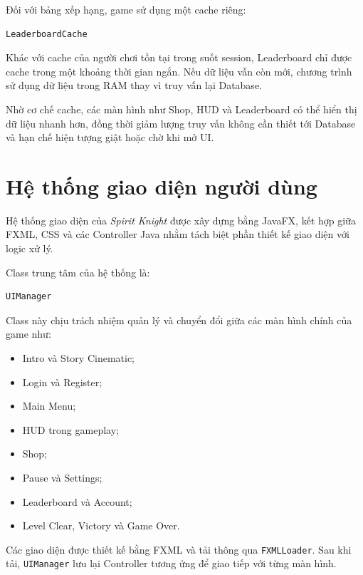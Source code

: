 \documentclass[12pt,a4paper]{report}
\begin{document}
    Đối với bảng xếp hạng, game sử dụng một cache riêng:

    \begin{verbatim}
LeaderboardCache
    \end{verbatim}

    Khác với cache của người chơi tồn tại trong suốt session,
    Leaderboard chỉ được cache trong một khoảng thời gian ngắn.
    Nếu dữ liệu vẫn còn mới, chương trình sử dụng dữ liệu trong RAM
    thay vì truy vấn lại Database.

    Nhờ cơ chế cache, các màn hình như Shop, HUD và Leaderboard có thể
    hiển thị dữ liệu nhanh hơn, đồng thời giảm lượng truy vấn không cần
    thiết tới Database và hạn chế hiện tượng giật hoặc chờ khi mở UI.


    \chapter{Hệ thống giao diện người dùng}

    Hệ thống giao diện của \textit{Spirit Knight} được xây dựng bằng
    JavaFX, kết hợp giữa FXML, CSS và các Controller Java nhằm tách biệt
    phần thiết kế giao diện với logic xử lý.

    Class trung tâm của hệ thống là:

    \begin{verbatim}
UIManager
    \end{verbatim}

    Class này chịu trách nhiệm quản lý và chuyển đổi giữa các màn hình
    chính của game như:

    \begin{itemize}
        \item Intro và Story Cinematic;
        \item Login và Register;
        \item Main Menu;
        \item HUD trong gameplay;
        \item Shop;
        \item Pause và Settings;
        \item Leaderboard và Account;
        \item Level Clear, Victory và Game Over.
    \end{itemize}

    Các giao diện được thiết kế bằng FXML và tải thông qua
    \texttt{FXMLLoader}. Sau khi tải, \texttt{UIManager} lưu lại
    Controller tương ứng để giao tiếp với từng màn hình.
\end{document}
